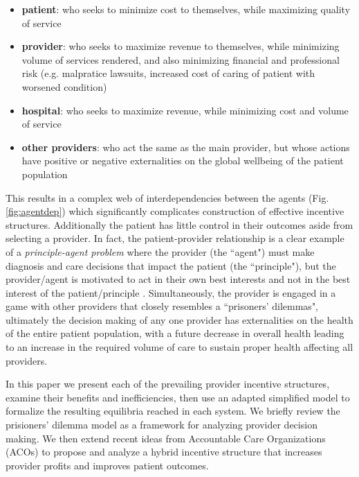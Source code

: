 \documentclass{article}
\begin{document}
\begin{itemize}
    \item \textbf{patient}: who seeks to minimize cost to themselves, while maximizing quality of service
    \item \textbf{provider}: who seeks to maximize revenue to themselves, while minimizing volume of services rendered, and also minimizing financial and professional risk (e.g. malpratice lawsuits, increased cost of caring of patient with worsened condition)
    \item \textbf{hospital}: who seeks to maximize revenue, while minimizing cost and volume of service
    \item \textbf{other providers}: who act the same as the main provider, but whose actions have positive or negative externalities on the global wellbeing of the patient population
\end{itemize}

This results in a complex web of interdependencies between the agents (Fig. \ref{fig:agentdep}) which significantly complicates construction of effective incentive structures. Additionally the patient has little control in their outcomes aside from selecting a provider. In fact, the patient-provider relationship is a clear example of a \emph{principle-agent problem} \cite{principle} where the provider (the ``agent") must make diagnosis and care decisions that impact the patient (the ``principle"), but the provider/agent is motivated to act in their own best interests and not in the best interest of the patient/principle \cite{msdt}. Simultaneously, the provider is engaged in a game with other providers that closely resembles a ``prisoners' dilemmas", ultimately the decision making of any one provider has externalities on the health of the entire patient population, with a future decrease in overall health leading to an increase in the required volume of care to sustain proper health \cite{blended} affecting all providers.

In this paper we present each of the prevailing provider incentive structures, examine their benefits and inefficiencies, then use an adapted simplified model to formalize the resulting equilibria reached in each system. We briefly review the prisioners' dilemma model as a framework for analyzing provider decision making. We then extend recent ideas from Accountable Care Organizations (ACOs) to propose and analyze a hybrid incentive structure that increases provider profits and improves patient outcomes.
\end{document}
